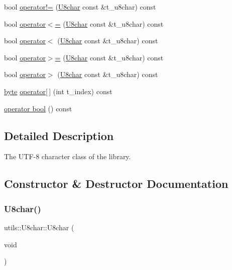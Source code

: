 \begin{DoxyCompactItemize}
bool \hyperlink{classutils_1_1U8char_ae51350fc92e66cfb9ac5784e483f4c59}{operator!=} (\hyperlink{classutils_1_1U8char}{U8char} const \&t\+\_\+u8char) const
\item 
bool \hyperlink{classutils_1_1U8char_aadba92f7615944b5a56e1c741b4e1d14}{operator$<$=} (\hyperlink{classutils_1_1U8char}{U8char} const \&t\+\_\+u8char) const
\item 
bool \hyperlink{classutils_1_1U8char_aafa1ab43156a534f3d450772b0833b98}{operator$<$} (\hyperlink{classutils_1_1U8char}{U8char} const \&t\+\_\+u8char) const
\item 
bool \hyperlink{classutils_1_1U8char_a5b7e27b12e6ff45253996414d4fc77fa}{operator$>$=} (\hyperlink{classutils_1_1U8char}{U8char} const \&t\+\_\+u8char) const
\item 
bool \hyperlink{classutils_1_1U8char_a768633a36d10be09756cd66c6346b609}{operator$>$} (\hyperlink{classutils_1_1U8char}{U8char} const \&t\+\_\+u8char) const
\item 
\hyperlink{namespaceutils_a6ec9293c5f79998946269edb0f6bc028}{byte} \hyperlink{classutils_1_1U8char_ae161e7637c19413fbc0a639fb5e43e45}{operator\mbox{[}$\,$\mbox{]}} (int t\+\_\+index) const
\item 
\hyperlink{classutils_1_1U8char_a09e51153dd354d8c33607401a52caf71}{operator bool} () const
\end{DoxyCompactItemize}


\subsection{Detailed Description}
The U\+T\+F-\/8 character class of the library. 

\subsection{Constructor \& Destructor Documentation}
\mbox{\label{classutils_1_1U8char_a2d500aa5e968fd99c6bd4012f63c54c5}} 
\subsubsection{\texorpdfstring{U8char()}{U8char()}\hspace{0.1cm}{\footnotesize\ttfamily [1/2]}}
{\footnotesize\ttfamily utils\+::\+U8char\+::\+U8char (\begin{DoxyParamCaption}\item[{void}]{ }\end{DoxyParamCaption})}

